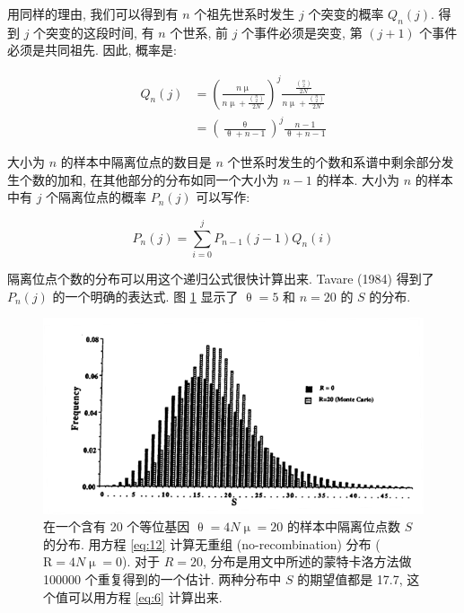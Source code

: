 \documentclass[12pt]{article}
\begin{document}
用同样的理由, 我们可以得到有 $n$ 个祖先世系时发生 $j$ 个突变的概率 $Q_{n}(j)$. 得到 $j$ 个突变的这段时间, 有 $n$
个世系, 前 $j$ 个事件必须是突变, 第 $(j+1)$ 个事件必须是共同祖先. 因此, 概率是:

\begin{equation} \label{eq:11}
    \begin{split}
        Q_{n}(j) & = \left (\frac{n\upmu}{n\upmu + \frac{\binom{n}{2}}{2N}} \right )^{j} \frac{\frac{\binom{n}{2}}{2N}}{n\upmu + \frac{\binom{n}{2}}{2N}} \\
        & = \left (\frac{\uptheta}{\uptheta + n - 1} \right )^{j} \frac{n-1}{\uptheta + n - 1}
    \end{split}
\end{equation}

大小为 $n$ 的样本中隔离位点的数目是 $n$ 个世系时发生的个数和系谱中剩余部分发生个数的加和, 在其他部分的分布如同一个大小为
$n-1$ 的样本. 大小为 $n$ 的样本中有 $j$ 个隔离位点的概率 $P_{n}(j)$ 可以写作:

\begin{equation} \label{eq:12}
    P_{n}(j) = \sum_{i=0}^{j} P_{n-1}(j-1) Q_{n}(i)
\end{equation}

隔离位点个数的分布可以用这个递归公式很快计算出来. Tavare (1984) 得到了 $P_{n}(j)$ 的一个明确的表达式. 图
\ref{fig:2} 显示了 $\uptheta=5$ 和 $n=20$ 的 $S$ 的分布.

\begin{figure}
    \centering
    \includegraphics{coalescent-process.images/image2.png}
    \caption{在一个含有 20 个等位基因 $\uptheta = 4N\upmu = 20$ 的样本中隔离位点数 $S$ 的分布.
        用方程 \ref{eq:12} 计算无重组 (no-recombination) 分布 ($\mathrm{R}=4N\upmu =0$).
        对于 $R=20$, 分布是用文中所述的蒙特卡洛方法做 100000 个重复得到的一个估计.
        两种分布中 $S$ 的期望值都是 17.7, 这个值可以用方程 \ref{eq:6} 计算出来.}
    \label{fig:2}
\end{figure}
\end{document}
